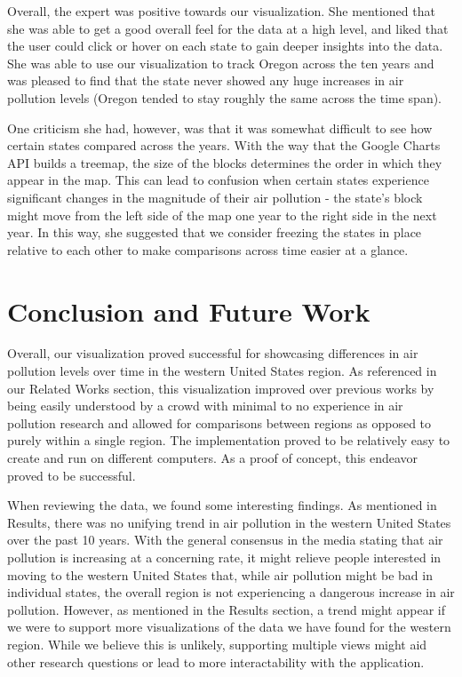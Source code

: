\documentclass[journal]{vgtc}                %
\begin{document}
Overall, the expert was positive towards our visualization. She mentioned that she was
able to get a good overall feel for the data at a high level, and liked that the user
could click or hover on each state to gain deeper insights into the data. She was able
to use our visualization to track Oregon across the ten years and was pleased to find
that the state never showed any huge increases in air pollution levels (Oregon tended
to stay roughly the same across the time span). 

One criticism she had, however, was that it was somewhat difficult to see how certain 
states compared across the years. With the way that the Google Charts API builds a 
treemap, the size of the blocks determines the order in which they appear in the map. 
This can lead to confusion when certain states experience significant changes in the 
magnitude of their air pollution - the state's block might move from the left side of
the map one year to the right side in the next year. In this way, she suggested that
we consider freezing the states in place relative to each other to make comparisons
across time easier at a glance.


\section{Conclusion and Future Work}

Overall, our visualization proved successful for showcasing differences
in air pollution levels over time in the western United States region.
As referenced in our Related Works section, this visualization improved
over previous works by being easily understood by a crowd with minimal to no experience in 
air pollution research
and allowed for comparisons between regions as opposed to purely within
a single region. The implementation proved to be relatively
easy to create and run on different computers. As a proof of concept, this endeavor proved to be
successful.

When reviewing the data, we found some interesting findings. As mentioned in Results, there was no unifying
trend in air pollution in the western United States over the past 10 years. With the general consensus in the media
stating that air pollution is increasing at a concerning rate, it might relieve people interested in
moving to the western United States that, while air pollution might be bad in individual states, the overall region
is not experiencing a dangerous increase in air pollution. However, as mentioned in the Results section, a trend might
appear if we were to support more visualizations of the data we have found for the western region. While we believe this is unlikely,
supporting multiple views might aid other research questions or lead to more interactability with the application.
\end{document}
